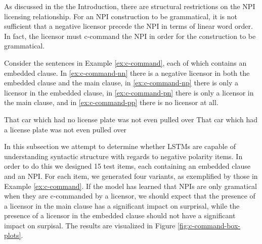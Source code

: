 \documentclass[11pt, round]{article}
\begin{document}
As discussed in the the Introduction, there are structural restrictions on the NPI licensing relationship. For an NPI construction to be grammatical, it is not sufficient that a negative licensor precede the NPI in terms of linear word order. In fact, the licensor must c-command the NPI in order for the construction to be grammatical.

Consider the sentences in Example \ref{ex:c-command}, each of which contains an embedded clause. In \ref{ex:c-command-nn} there is a negative licensor in both the embedded clause and the main clause, in \ref{ex:c-command-np} there is only a licensor in the embedded clause, in \ref{ex:c-command-pn} there is only a licensor in the main clause, and in \ref{ex:c-command-pp} there is no licensor at all.

\begin{exe}
\ex
\label{ex:c-command}
\begin{xlist}
\ex \label{ex:c-command-nn} That car which had no license plate was not even pulled over
\ex \label{ex:c-command-pn} That car which had a license plate was not even pulled over
\end{xlist}
\end{exe}

In this subsection we attempt to determine whether LSTMs are capable of understanding syntactic structure with regards to negative polarity items. In order to do this we designed 15 test items, each containing an embedded clause and an NPI. For each item, we generated four variants, as exemplified by those in Example \ref{ex:c-command}. If the model has learned that NPIs are only gramatical when they are c-commanded by a licensor, we should expect that the presence of a licensor in the main clause has a significant impact on surprisal, while the presence of a licensor in the embedded clause should not have a significant impact on surpisal. The results are visualized in Figure \ref{fig:c-command-box-plots}.
\end{document}
